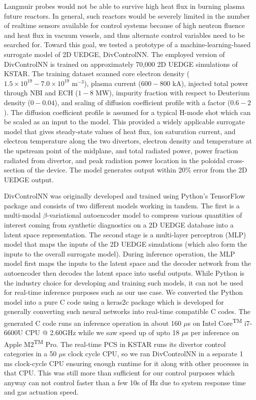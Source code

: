 Langmuir probes would not be able to survive high heat flux in burning plasma future reactors.
In general, such reactors would be severely limited in the number of realtime sensors available for control systems because of high neutron fluence and heat flux in vacuum vessels, and thus alternate control variables need to be searched for.
Toward this goal, we tested a prototype of a machine-learning-based surrogate model of 2D UEDGE, DivControlNN.
The employed version of DivControlNN is trained on approximately 70,000 2D UEDGE simulations of KSTAR.
The training dataset scanned core electron density ($1.5 \times 10^{19} - 7.0 \times 10^{19}$ m$^{-3}$), plasma current ($600-800$ kA), injected total power through NBI and ECH ($1-8$ MW), impurity fraction with respect to Deuterium density ($0-0.04$), and scaling of diffusion coefficient profile with a factor ($0.6 - 2$).
The diffusion coefficient profile is assumed for a typical H-mode shot which can be scaled as an input to the model.
This provided a widely applicable surrogate model that gives steady-state values of heat flux, ion saturation current, and electron temperature along the two divertors, electron density and temperature at the upstream point of the midplane, and total radiated power, power fraction radiated from divertor, and peak radiation power location in the poloidal cross-section of the device.
The model generates output within 20\% error from the 2D UEDGE output.

DivControlNN was originally developed and trained using Python's TensorFlow package and consists of two different models working in tandem.
The first is a multi-modal $\beta$-variational autoencoder\cite{Higgins_2017_ICLR} model to compress various quantities of interest coming from synthetic diagnostics on a 2D UEDGE database into a latent space representation.
The second stage is a multi-layer perceptron (MLP) model that maps the inputs of the 2D UEDGE simulations (which also form the inputs to the overall surrogate model).
During inference operation, the MLP model first maps the inputs to the latent space and the decoder network from the autoencoder then decodes the latent space into useful outputs.
While Python is the industry choice for developing and training such models, it can not be used for real-time inference purposes such as our use case.
We converted the Python model into a pure C code using a keras2c\cite{keras2c} package which is developed for generally converting such neural networks into real-time compatible C codes.
The generated C code runs an inference operation in about 160 $\mu$s on Intel\textsuperscript{\textregistered} Core\textsuperscript{TM} i7-6600U CPU @ 2.60GHz while we saw speed up of upto 18 $\mu$s per inference on Apple\textsuperscript{\textregistered} M2\textsuperscript{TM} Pro.
The real-time PCS in KSTAR runs its divertor control categories in a 50 $\mu$s clock cycle CPU, so we ran DivControlNN in a separate 1 ms clock-cycle CPU ensuring enough runtime for it along with other processes in that CPU.
This was still more than sufficient for our control purposes which anyway can not control faster than a few 10s of Hz due to system response time and gas actuation speed.

